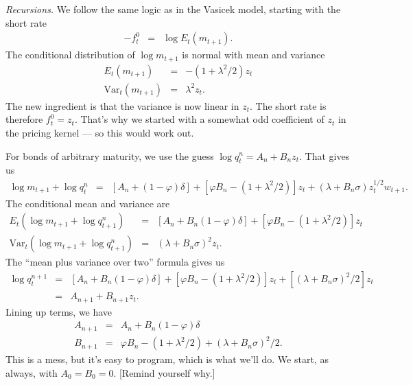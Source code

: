 \documentclass[11pt]{article}
\begin{document}
{\it Recursions.\/}
We follow the same logic as in the Vasicek model,
starting with the short rate
\begin{eqnarray*}
    - f^0_t &=&   \log E_t (m_{t+1} ).
\end{eqnarray*}
The conditional distribution of $\log m_{t+1}$ is
normal with mean and variance
\begin{eqnarray*}
    E_t (m_{t+1}) &=& - (1+\lambda^2/2) z_t \\
    \mbox{Var}_t (m_{t+1}) &=& \lambda^2 z_t .
\end{eqnarray*}
The new ingredient is that the variance is now linear in $z_t$.
The short rate is therefore
$ f^0_t = z_t $.
That's why we started with a somewhat odd coefficient of $z_t$
in the pricing kernel --- so this would work out.

For bonds of arbitrary maturity,
we use the guess  $ \log q^n_t = A_n + B_n z_t$.
That gives us
\begin{eqnarray*}
    \log m_{t+1} + \log q^{n}_t &=&
            [A_n + (1-\varphi) \delta] + [\varphi B_n -(1+\lambda^2/2)] z_t
                    + (\lambda + B_n \sigma) z_t^{1/2} w_{t+1} .
\end{eqnarray*}
The conditional mean and variance are
\begin{eqnarray*}
   E_t \left( \log m_{t+1} + \log q^{n}_{t+1} \right) &=&
            [A_n + B_n (1-\varphi) \delta] + [\varphi B_n -(1+\lambda^2/2)] z_t \\
   \mbox{Var}_t \left( \log m_{t+1} + \log q^{n}_{t+1} \right) &=&
            (\lambda + B_n \sigma)^2 z_t .
\end{eqnarray*}
The ``mean plus variance over two'' formula gives us
\begin{eqnarray*}
    \log q^{n+1}_t &=&
            [A_n + B_n (1-\varphi) \delta] + [\varphi B_n -(1+\lambda^2/2)] z_t
                    + [(\lambda + B_n \sigma)^2/2]  z_t  \\
                &=& A_{n+1} + B_{n+1} z_t.
\end{eqnarray*}
Lining up terms, we have
\begin{eqnarray*}
    A_{n+1} &=& A_n + B_n (1-\varphi) \delta \\
    B_{n+1} &=& \varphi B_n -(1+\lambda^2/2) + (\lambda + B_n \sigma)^2/2 .
\end{eqnarray*}
This is a mess, but it's easy to program, which is what we'll do.
We start, as always, with $A_0 = B_0 = 0$.
[Remind yourself why.]
\end{document}
